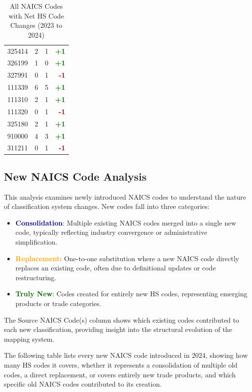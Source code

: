\documentclass[11pt]{article}
\begin{document}
\begin{table}[H]
\begin{minipage}{0.48\textwidth}
\begin{tabular}{lrrr}
325414 & 2 & 1 & \textcolor{darkgreen}{\textbf{+1}} \\
326199 & 1 & 0 & \textcolor{darkgreen}{\textbf{+1}} \\
327991 & 0 & 1 & \textcolor{darkred}{\textbf{-1}} \\
111339 & 6 & 5 & \textcolor{darkgreen}{\textbf{+1}} \\
111310 & 2 & 1 & \textcolor{darkgreen}{\textbf{+1}} \\
111320 & 0 & 1 & \textcolor{darkred}{\textbf{-1}} \\
325180 & 2 & 1 & \textcolor{darkgreen}{\textbf{+1}} \\
910000 & 4 & 3 & \textcolor{darkgreen}{\textbf{+1}} \\
311211 & 0 & 1 & \textcolor{darkred}{\textbf{-1}} \\
\bottomrule
\end{tabular}
\end{minipage}
\caption{All NAICS Codes with Net HS Code Changes (2023 to 2024)}
\end{table}


\subsection{New NAICS Code Analysis}

This analysis examines newly introduced NAICS codes to understand the nature of classification system changes. New codes fall into three categories:

\begin{itemize}
    \item \textcolor{darkblue}{\textbf{Consolidation}}: Multiple existing NAICS codes merged into a single new code, typically reflecting industry convergence or administrative simplification.
    \item \textcolor{orange}{\textbf{Replacement}}: One-to-one substitution where a new NAICS code directly replaces an existing code, often due to definitional updates or code restructuring.
    \item \textcolor{darkgreen}{\textbf{Truly New}}: Codes created for entirely new HS codes, representing emerging products or trade categories.
\end{itemize}

The Source NAICS Code(s) column shows which existing codes contributed to each new classification, providing insight into the structural evolution of the mapping system.

The following table lists every new NAICS code introduced in 2024, showing how many HS codes it covers, whether it represents a consolidation of multiple old codes, a direct replacement, or covers entirely new trade products, and which specific old NAICS codes contributed to its creation.
\end{document}
